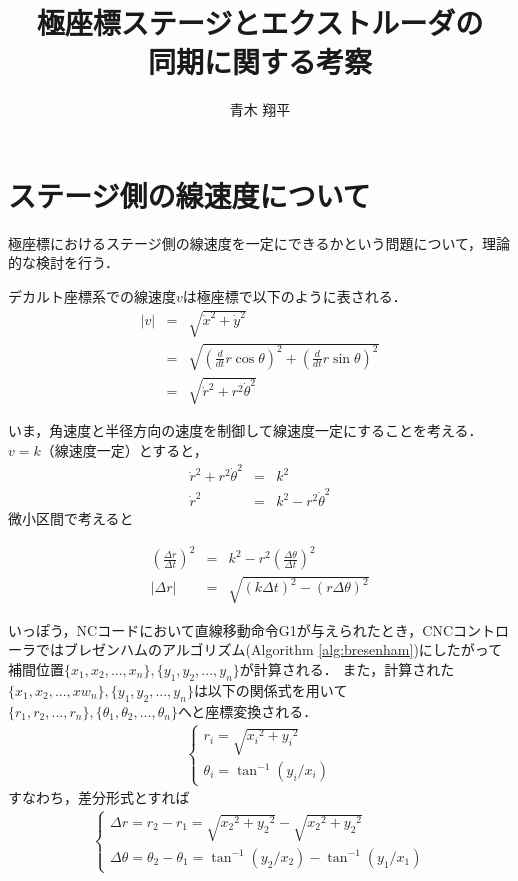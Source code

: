 \documentclass[twocolumn,oneside,a4paper]{article}
\title{極座標ステージとエクストルーダの\\同期に関する考察}
\author{青木 翔平}
\begin{document}
\maketitle

\section{ステージ側の線速度について}
極座標におけるステージ側の線速度を一定にできるかという問題について，理論的な検討を行う．

デカルト座標系での線速度$v$は極座標で以下のように表される．
\begin{eqnarray}
|v| &=& \sqrt{\dot{x}^2 + \dot{y}^2} \nonumber \\
  &=& \sqrt{ \left(\frac{d}{dt} r \cos\theta \right) ^2 + \left(\frac{d}{dt}r \sin\theta\right) ^2} \nonumber \\
  &=& \sqrt{ \dot{r}^2+ r^2 \dot{\theta}^2 } 
\end{eqnarray}	
	
いま，角速度と半径方向の速度を制御して線速度一定にすることを考える．
$v=k$（線速度一定）とすると，
\begin{eqnarray}\label{eq:vdef}
  \dot{r}^2+ r^2 \dot{\theta}^2 &=& k^2 \\
  \dot{r}^2 &=&  k^2 - r^2 \dot{\theta}^2 
\end{eqnarray}
微小区間で考えると

\begin{eqnarray}\label{eq:deltar}
	\left( \frac{\Delta r}{\Delta t}\right)^2 &=&  k^2 - r^2 \left( \frac{\Delta \theta}{\Delta t}\right)^2 \nonumber \\
|\Delta r| &=& \sqrt{(k \Delta t)^2 - (r \Delta \theta)^2}
\end{eqnarray}

いっぽう，NCコードにおいて直線移動命令G1が与えられたとき，CNCコントローラではブレゼンハムのアルゴリズム(Algorithm \ref{alg:bresenham})にしたがって補間位置$\{x_1,x_2,...,x_n\},\{y_1,y_2,...,y_n\}$が計算される．
また，計算された$\{x_1,x_2,...,xw_n\},\{y_1,y_2,...,y_n\}$は以下の関係式を用いて$\{r_1,r_2,...,r_n\},\{\theta_1,\theta_2,...,\theta_n\}$へと座標変換される．　
\begin{eqnarray*}
\left\{
  \begin{array}{ll}
r_i = \sqrt{{x_i}^2+{y_i}^2} \\	
\theta_i = \tan^{-1} (y_i / x_i)
  \end{array}
  \right.
\end{eqnarray*}
すなわち，差分形式とすれば
\begin{eqnarray}\label{eq:diff}
\left\{
  \begin{array}{ll}
\Delta r = r_2-r_1 = \sqrt{{x_2}^2+{y_2}^2} - \sqrt{{x_2}^2+{y_2}^2} \\	
\Delta \theta = \theta_2-\theta_1 = \tan^{-1} (y_2 / x_2) - \tan^{-1} (y_1 / x_1)
  \end{array}
  \right. 
\end{eqnarray}
\end{document}
